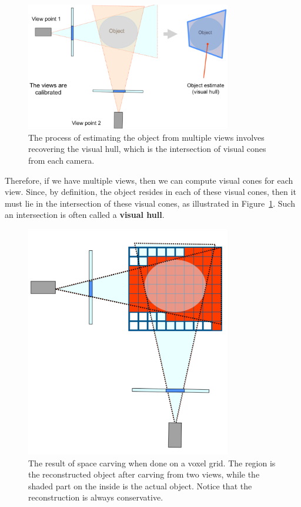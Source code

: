 \documentclass[a4paper, 12pt]{article}
\renewcommand\emph{\textbf}
\numberwithin{equation}{section}
\begin{document}
\begin{figure}[h!]
    \centering
    \includegraphics[width = 0.8\textwidth]{figures/visual_hull.png}
    \caption{The process of estimating the object from multiple views involves recovering the visual hull, which is the intersection of visual cones from each camera.}
    \label{fig:visual_hull}
\end{figure}

Therefore, if we have multiple views, then we can compute visual cones for each view. Since, by definition, the object resides in each of these visual cones, then it must lie in the intersection of these visual cones, as illustrated in Figure~\ref{fig:visual_hull}. Such an intersection is often called a \emph{visual hull}. 

\begin{figure}[h!]
    \centering
    \includegraphics[width = 0.8\textwidth]{figures/space_carving.png}
    \caption{The result of space carving when done on a voxel grid. The region is the reconstructed object after carving from two views, while the shaded part on the inside is the actual object. Notice that the reconstruction is always conservative.}
    \label{fig:space_carving}
\end{figure}
\end{document}

